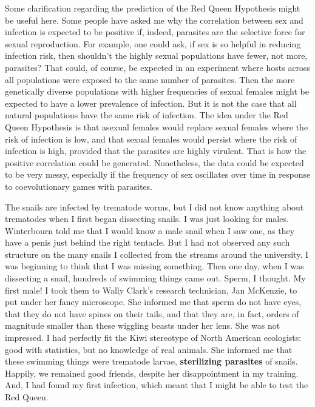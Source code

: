 \documentclass[
  letterpaper,
]{book}
\begin{document}
Some clarification regarding the prediction of the Red Queen Hypothesis
might be useful here. Some people have asked me why the correlation
between sex and infection is expected to be positive if, indeed,
parasites are the selective force for sexual reproduction. For example,
one could ask, if sex is so helpful in reducing infection risk, then
shouldn't the highly sexual populations have fewer, not more, parasites?
That could, of course, be expected in an experiment where hosts across
all populations were exposed to the same number of parasites. Then the
more genetically diverse populations with higher frequencies of sexual
females might be expected to have a lower prevalence of infection. But
it is not the case that all natural populations have the same risk of
infection. The idea under the Red Queen Hypothesis is that asexual
females would replace sexual females where the risk of infection is low,
and that sexual females would persist where the risk of infection is
high, provided that the parasites are highly virulent. That is how the
positive correlation could be generated. Nonetheless, the data could be
expected to be very messy, especially if the frequency of sex oscillates
over time in response to coevolutionary games with parasites.

The snails are infected by trematode worms, but I did not know anything
about trematodes when I first began dissecting snails. I was just
looking for males. Winterbourn told me that I would know a male snail
when I saw one, as they have a penis just behind the right tentacle. But
I had not observed any such structure on the many snails I collected
from the streams around the university. I was beginning to think that I
was missing something. Then one day, when I was dissecting a snail,
hundreds of swimming things came out. Sperm, I thought. My first male! I
took them to Wally Clark's research technician, Jan McKenzie, to put
under her fancy microscope. She informed me that sperm do not have eyes,
that they do not have spines on their tails, and that they are, in fact,
orders of magnitude smaller than these wiggling beasts under her lens.
She was not impressed. I had perfectly fit the Kiwi stereotype of North
American ecologists: good with statistics, but no knowledge of real
animals. She informed me that these swimming things were trematode
larvae, \textbf{sterilizing parasites} of snails. Happily, we remained
good friends, despite her disappointment in my training. And, I had
found my first infection, which meant that I might be able to test the
Red Queen.
\end{document}

